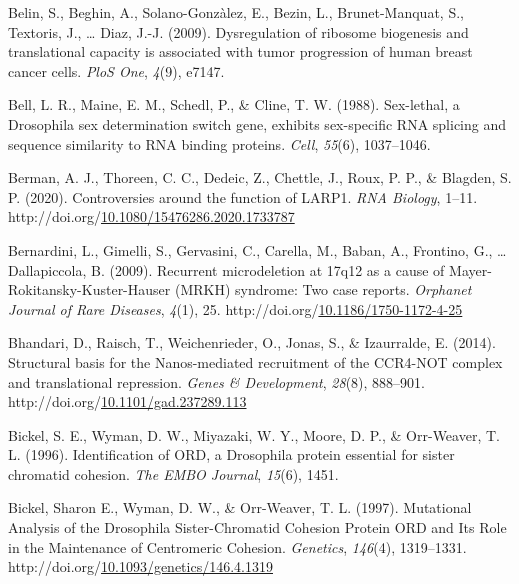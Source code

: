 \documentclass[12pt,oneside]{reedthesis}
\newlength{\cslhangindent}
\newenvironment{CSLReferences}[2] %
 {%
  \setlength{\parindent}{0pt}
  \ifodd #1 \everypar{\setlength{\hangindent}{\cslhangindent}}\ignorespaces\fi
  \ifnum #2 > 0
  \setlength{\parskip}{#2\baselineskip}
  \fi
 }%
 {}
\begin{document}
\begin{CSLReferences}{1}{0}
\leavevmode{}%
Belin, S., Beghin, A., Solano-Gonzàlez, E., Bezin, L., Brunet-Manquat, S., Textoris, J., \ldots{} Diaz, J.-J. (2009). Dysregulation of ribosome biogenesis and translational capacity is associated with tumor progression of human breast cancer cells. \emph{PloS One}, \emph{4}(9), e7147.

\leavevmode{}%
Bell, L. R., Maine, E. M., Schedl, P., \& Cline, T. W. (1988). Sex-lethal, a {Drosophila} sex determination switch gene, exhibits sex-specific {RNA} splicing and sequence similarity to {RNA} binding proteins. \emph{Cell}, \emph{55}(6), 1037--1046.

\leavevmode{}%
Berman, A. J., Thoreen, C. C., Dedeic, Z., Chettle, J., Roux, P. P., \& Blagden, S. P. (2020). Controversies around the function of {LARP1}. \emph{RNA Biology}, 1--11. http://doi.org/\href{https://doi.org/10.1080/15476286.2020.1733787}{10.1080/15476286.2020.1733787}

\leavevmode{}%
Bernardini, L., Gimelli, S., Gervasini, C., Carella, M., Baban, A., Frontino, G., \ldots{} Dallapiccola, B. (2009). Recurrent microdeletion at 17q12 as a cause of {Mayer-Rokitansky-Kuster-Hauser} ({MRKH}) syndrome: Two case reports. \emph{Orphanet Journal of Rare Diseases}, \emph{4}(1), 25. http://doi.org/\href{https://doi.org/10.1186/1750-1172-4-25}{10.1186/1750-1172-4-25}

\leavevmode{}%
Bhandari, D., Raisch, T., Weichenrieder, O., Jonas, S., \& Izaurralde, E. (2014). Structural basis for the {Nanos-mediated} recruitment of the {CCR4-NOT} complex and translational repression. \emph{Genes \& Development}, \emph{28}(8), 888--901. http://doi.org/\href{https://doi.org/10.1101/gad.237289.113}{10.1101/gad.237289.113}

\leavevmode{}%
Bickel, S. E., Wyman, D. W., Miyazaki, W. Y., Moore, D. P., \& Orr-Weaver, T. L. (1996). Identification of {ORD}, a {Drosophila} protein essential for sister chromatid cohesion. \emph{The EMBO Journal}, \emph{15}(6), 1451.

\leavevmode{}%
Bickel, Sharon E., Wyman, D. W., \& Orr-Weaver, T. L. (1997). Mutational {Analysis} of the {Drosophila Sister-Chromatid Cohesion Protein ORD} and {Its Role} in the {Maintenance} of {Centromeric Cohesion}. \emph{Genetics}, \emph{146}(4), 1319--1331. http://doi.org/\href{https://doi.org/10.1093/genetics/146.4.1319}{10.1093/genetics/146.4.1319}


\end{CSLReferences}
\end{document}
